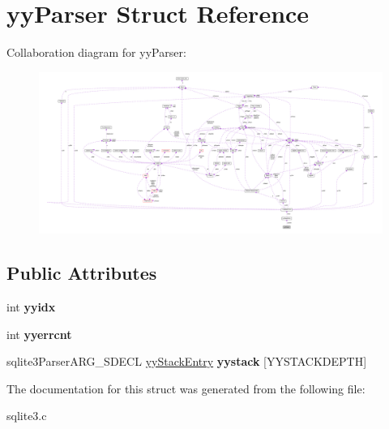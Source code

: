 \hypertarget{structyy_parser}{\section{yy\-Parser Struct Reference}
\label{structyy_parser}
}


Collaboration diagram for yy\-Parser\-:\nopagebreak
\begin{figure}[H]
\begin{center}
\leavevmode
\includegraphics[width=350pt]{structyy_parser__coll__graph}
\end{center}
\end{figure}
\subsection*{Public Attributes}
\begin{DoxyCompactItemize}
\item 
\hypertarget{structyy_parser_a19abcf4780515fd2debd1ce7a2e29f95}{int {\bfseries yyidx}}\label{structyy_parser_a19abcf4780515fd2debd1ce7a2e29f95}

\item 
\hypertarget{structyy_parser_ac0350933aa515a3a756dfa742d04ee59}{int {\bfseries yyerrcnt}}\label{structyy_parser_ac0350933aa515a3a756dfa742d04ee59}

\item 
\hypertarget{structyy_parser_ae8bc1531d6ae56020a7ee33a40783672}{sqlite3\-Parser\-A\-R\-G\-\_\-\-S\-D\-E\-C\-L \hyperlink{structyy_stack_entry}{yy\-Stack\-Entry} {\bfseries yystack} \mbox{[}Y\-Y\-S\-T\-A\-C\-K\-D\-E\-P\-T\-H\mbox{]}}\label{structyy_parser_ae8bc1531d6ae56020a7ee33a40783672}

\end{DoxyCompactItemize}


The documentation for this struct was generated from the following file\-:\begin{DoxyCompactItemize}
\item 
sqlite3.\-c\end{DoxyCompactItemize}
